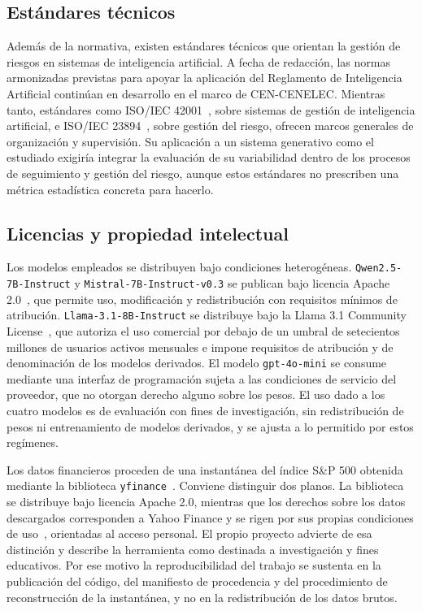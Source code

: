\subsection{Estándares técnicos}

Además de la normativa, existen estándares técnicos que orientan la gestión de riesgos en sistemas de inteligencia artificial. A fecha de redacción, las normas armonizadas previstas para apoyar la aplicación del Reglamento de Inteligencia Artificial continúan en desarrollo en el marco de CEN-CENELEC. Mientras tanto, estándares como ISO/IEC 42001~\cite{iso42001}, sobre sistemas de gestión de inteligencia artificial, e ISO/IEC 23894~\cite{iso23894}, sobre gestión del riesgo, ofrecen marcos generales de organización y supervisión. Su aplicación a un sistema generativo como el estudiado exigiría integrar la evaluación de su variabilidad dentro de los procesos de seguimiento
y gestión del riesgo, aunque estos estándares no prescriben una métrica estadística concreta para hacerlo.

\subsection{Licencias y propiedad intelectual}

Los modelos empleados se distribuyen bajo condiciones heterogéneas. \texttt{Qwen2.5-7B-Instruct} y \texttt{Mistral-7B-Instruct-v0.3} se publican bajo licencia Apache 2.0~\cite{apache2004license}, que permite uso, modificación y redistribución con requisitos mínimos de atribución. \texttt{Llama-3.1-8B-Instruct} se distribuye bajo la Llama 3.1 Community License~\cite{meta2024llamalicense}, que autoriza el uso comercial por debajo de un umbral de setecientos millones de usuarios activos mensuales e impone requisitos de atribución y de denominación de los modelos derivados. El modelo \texttt{gpt-4o-mini} se consume mediante una interfaz de programación sujeta a las condiciones de servicio del proveedor, que no otorgan derecho alguno sobre los pesos. El uso dado a los cuatro modelos es de evaluación con fines de investigación, sin redistribución de pesos ni entrenamiento de modelos derivados, y se ajusta a lo permitido por estos regímenes.

Los datos financieros proceden de una instantánea del índice S\&P 500 obtenida mediante la biblioteca \texttt{yfinance}~\cite{yfinance}. Conviene distinguir dos planos. La biblioteca se distribuye bajo licencia Apache 2.0, mientras que los derechos sobre los datos descargados corresponden a Yahoo Finance y se rigen por sus propias condiciones de uso~\cite{yahoo_tos}, orientadas al acceso personal. El propio proyecto advierte de esa distinción y describe la herramienta como destinada a investigación y fines educativos. Por ese motivo la reproducibilidad del trabajo se sustenta en la publicación del código, del manifiesto de procedencia y del procedimiento de reconstrucción de la instantánea, y no en la redistribución de los datos brutos.


